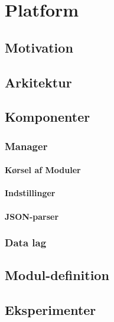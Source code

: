 





\chapter{Platform}
\section{Motivation} %
\section{Arkitektur}

\section{Komponenter}
\subsection{Manager}
\subsubsection{Kørsel af Moduler}

\subsubsection{Indstillinger}

\subsubsection{JSON-parser}\label{subsub:JSONparser}

\subsection{Data lag}


\section{Modul-definition}\label{modul_definition}


\section{Eksperimenter}


